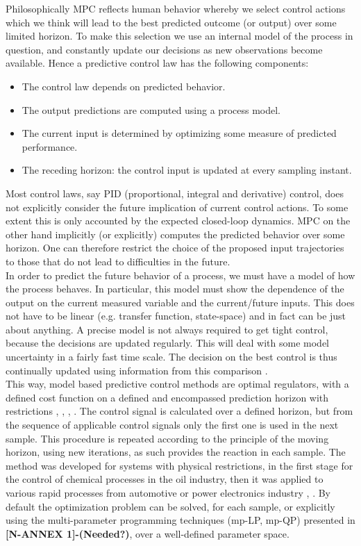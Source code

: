 Philosophically MPC reflects human behavior whereby we select control actions which we think will lead to the best predicted outcome (or output) over some limited horizon. To make this selection we use an internal model of the process in question, and constantly update our decisions as new observations become available. Hence a predictive control law has the following components:
\begin{itemize}
\item The control law depends on predicted behavior.
\item The output predictions are computed using a process model.
\item The current input is determined by optimizing some measure of predicted performance.
\item The receding horizon: the control input is updated at every sampling instant.
\end{itemize}

Most control laws, say PID (proportional, integral and derivative) control, does not explicitly consider the future implication of current control actions. To some extent this is only accounted by the expected closed-loop dynamics. MPC on the other hand
implicitly (or explicitly) computes the predicted behavior over some horizon. One can therefore restrict the choice of the proposed input trajectories to those that do not lead to difficulties in the future.\\
In order to predict the future behavior of a process, we must have a model of how the process behaves. In particular, this model must show the dependence of the output on the current measured variable and the current/future inputs. This does not have to be linear (e.g. transfer function, state-space) and in fact can be just about anything. A precise model is not always required to get tight control, because the decisions are updated regularly. This will deal with some model uncertainty in a fairly fast time scale. The decision on the best control is thus continually updated using information from this comparison \cite{rossiter2017model}.\\
This way, model based predictive control methods are optimal regulators, with a defined cost function on a defined and encompassed prediction horizon with restrictions \cite{kwon2006receding}, \cite{baotic2005optimal}, \cite{herceg2009real}, \cite{grancharova2005survey}. The control signal is calculated over a defined horizon, but from the sequence of applicable control signals only the first one is used in the next sample. This procedure is repeated according to the principle of the moving horizon, using new iterations, as such provides the reaction in each sample. The method was developed for systems with physical restrictions, in the first stage for the control of chemical processes in the oil industry, then it was applied to various rapid processes from automotive or power electronics industry \cite{antoniewicz2009predictive} , \cite{geyer2005low}. By default the optimization problem can be solved, for each sample, or explicitly using the multi-parameter programming techniques (mp-LP, mp-QP) presented in \textbf{[N-ANNEX 1]-(Needed?)}, over a well-defined parameter space.

